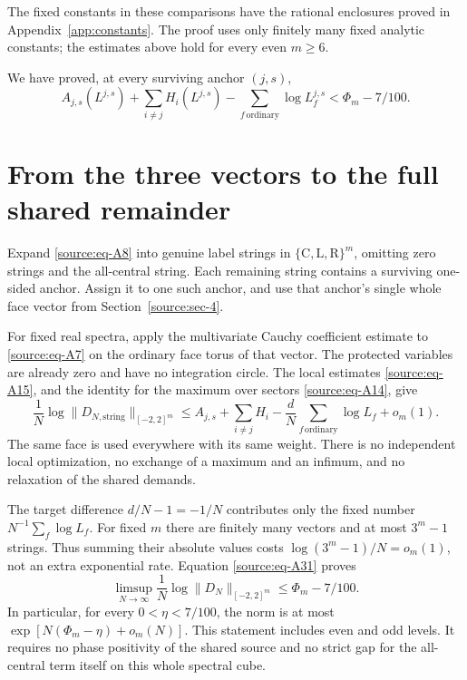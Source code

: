 \documentclass[11pt]{article}
\numberwithin{equation}{section}
\begin{document}
The fixed constants in these comparisons have the rational enclosures
proved in Appendix~\ref{app:constants}. The proof uses only finitely many
fixed analytic constants; the estimates above hold for every even \(m\ge6\).

We have proved, at every surviving anchor \((j,s)\), \begin{equation}\label{source:eq-A31}
A_{j,s}(L^{j,s})+\sum_{i\ne j}H_i(L^{j,s})
     -\sum_{f\,\mathrm{ordinary}}\log L_f^{j,s}
                        <\Phi_m-7/100.
\end{equation}

\section{From the three vectors to the full shared
remainder}\label{source:sec-6}

Expand \eqref{source:eq-A8} into genuine label strings in
\(\{\mathrm C,\mathrm L,\mathrm R\}^m\), omitting zero strings and the
all-central string. Each remaining string contains a surviving one-sided
anchor. Assign it to one such anchor, and use that anchor's single whole
face vector from Section~\ref{source:sec-4}.

For fixed real spectra, apply the multivariate Cauchy coefficient
estimate to \eqref{source:eq-A7} on the ordinary face torus of that vector. The
protected variables are already zero and have no integration circle. The
local estimates \eqref{source:eq-A15}, and the identity for the maximum over sectors \eqref{source:eq-A14}, give \begin{equation}\label{source:eq-A32}
\frac1N\log\|D_{N,\text{string}}\|_{[-2,2]^m}
 \le A_{j,s}+\sum_{i\ne j}H_i
       -\frac dN\sum_{f\,\mathrm{ordinary}}\log L_f+o_m(1).
\end{equation} The same face is used everywhere with its same weight. There is no
independent local optimization, no exchange of a maximum and an infimum,
and no relaxation of the shared demands.

The target difference \(d/N-1=-1/N\) contributes only the fixed number
\(N^{-1}\sum_f\log L_f\). For fixed \(m\) there are finitely many
vectors and at most \(3^m-1\) strings. Thus summing their absolute
values costs \(\log(3^m-1)/N=o_m(1)\), not an extra exponential rate.
Equation \eqref{source:eq-A31} proves \begin{equation}\label{source:eq-A33}
\limsup_{N\to\infty}\frac1N\log\|D_N\|_{[-2,2]^m}
                    \le\Phi_m-7/100.
\end{equation} In particular, for every \(0<\eta<7/100\), the norm is at most
\(\exp[N(\Phi_m-\eta)+o_m(N)]\). This statement includes even and odd
levels. It requires no phase positivity of the shared source and no
strict gap for the all-central term itself on this whole spectral cube.
\end{document}
